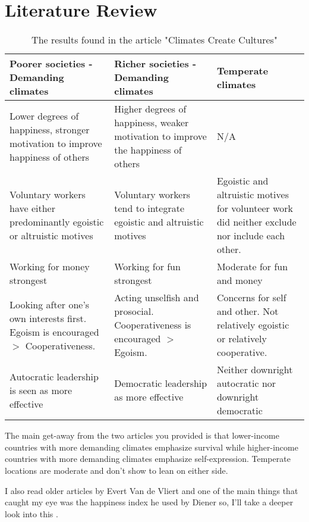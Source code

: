 \documentclass[a4paper,10pt]{article}
\begin{document}
\section{Literature Review}


\begin{center}
\begin{table}[!ht]
\caption{The results found in the article "Climates Create Cultures"}\label{tab:1}
\begin{tabularx}{1\textwidth} { 
    | >{\centering\arraybackslash}X 
    | >{\centering\arraybackslash}X 
    | >{\centering\arraybackslash}X | }
    \hline
    \textbf{Poorer societies - Demanding climates} & \textbf{Richer societies - Demanding climates} & \textbf{Temperate climates} \\
    \hline
    Lower degrees of happiness, stronger motivation to improve happiness of others 
    & Higher degrees of happiness, weaker motivation to improve the happiness of others 
    & N/A \\
    \hline
    Voluntary workers have either predominantly egoistic or altruistic motives 
    & Voluntary workers tend to integrate egoistic and altruistic motives
    & Egoistic and altruistic motives for volunteer work did neither exclude nor include each other. \\
    \hline
    Working for money strongest & Working for fun strongest & Moderate for fun and money \\
    \hline
    Looking after one’s own interests first. Egoism is encouraged $>$ Cooperativeness. 
    & Acting unselfish and prosocial. Cooperativeness is encouraged $>$ Egoism. 
    & Concerns for self and other. Not relatively egoistic or relatively cooperative. \\
    \hline
    Autocratic leadership is seen as more effective 
    & Democratic leadership as more effective 
    & Neither downright autocratic nor downright democratic \\
    \hline
    \end{tabularx}
\end{table}
\end{center}

The main get-away from the two articles you provided is that lower-income countries with more demanding climates emphasize survival while higher-income countries with more demanding climates emphasize self-expression. Temperate locations are moderate and don't show to lean on either side. \cite{van2007climates,van2012climate}

I also read older articles by Evert Van de Vliert \cite{van2004colder} and one of the main things that caught my eye was the happiness index he used by Diener so, I'll take a deeper look into this \cite{diener2009factors}. 




\end{document}
